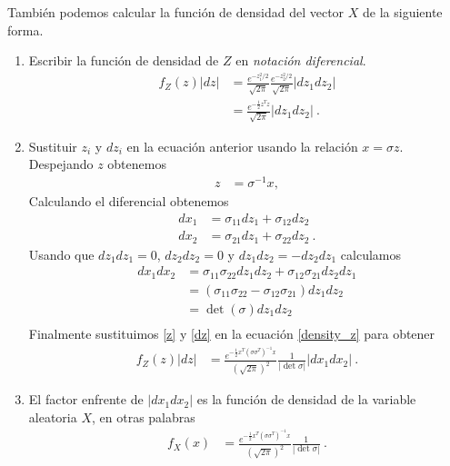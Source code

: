 \documentclass[12pt,reqno]{amsart}\usepackage[]{graphicx}\usepackage[]{color}
\begin{document}
También podemos calcular la función de densidad del vector $X$ de la siguiente forma.
\begin{enumerate}
\item Escribir la función de densidad de $Z$ en \emph{notación diferencial}.
\begin{equation}\label{density_z}
  \begin{split}
  f_{Z}(z) |dz| &= \frac{e^{-z_1^2/2}}{\sqrt{2\pi}}\frac{e^{-z_2^2/2}}{\sqrt{2\pi}} |dz_1 dz_2|\\
  &= \frac{e^{-\frac{1}{2}z^T z}}{\sqrt{2\pi}} |dz_1 dz_2|\:.
  \end{split}
\end{equation}
\item Sustituir $z_i$ y $dz_i$ en la ecuación anterior usando la relación $x = \sigma z$. 
Despejando $z$ obtenemos
\begin{equation}\label{z}
  \begin{split}
  z &= \sigma^{-1} x,  
  \end{split}
\end{equation}
Calculando el diferencial obtenemos
\begin{equation*}
  \begin{split}
  dx_1 &= \sigma_{11}dz_1 + \sigma_{12}dz_2\\
  dx_2 &= \sigma_{21}dz_1 + \sigma_{22}dz_2\:.
  \end{split}
\end{equation*}
Usando que $dz_1 dz_1=0$, $dz_2 dz_2=0$ y  $dz_1 dz_2 = - dz_2 dz_1$ calculamos
\begin{equation}\label{dz}
  \begin{split}
  dx_1 dx_2 &= \sigma_{11}\sigma_{22}dz_1 dz_2 + \sigma_{12}\sigma_{21} dz_2 dz_1\\
  &= (\sigma_{11}\sigma_{22}-  \sigma_{12}\sigma_{21})dz_1dz_2\\
  &= \det(\sigma) dz_1 dz_2\\
  \end{split}
\end{equation}
Finalmente sustituimos \eqref{z} y \eqref{dz} en la ecuación \eqref{density_z} para obtener
\begin{equation}\label{substitute_x}
  \begin{split}
  f_{Z}(z) |dz| &= \frac{e^{-\frac{1}{2}x^T(\sigma\sigma^T)^{-1}x}}{(\sqrt{2\pi})^2}\frac{1}{|\det{\sigma}|} |dx_1 dx_2|\:.
  \end{split}
\end{equation}
\item El factor enfrente de $|dx_1 dx_2|$ es la función de densidad de la variable aleatoria $X$, en otras palabras
\begin{equation}\label{density_x}
  \begin{split}
  f_{X}(x) &= \frac{e^{-\frac{1}{2}x^T(\sigma\sigma^T)^{-1}x}}{(\sqrt{2\pi})^2}\frac{1}{|\det{\sigma}|}\:.
  \end{split}
\end{equation}
\end{enumerate}
\end{document}
